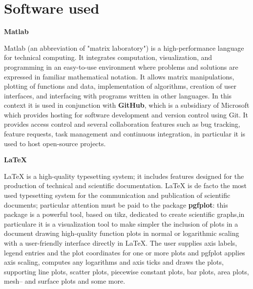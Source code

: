 \documentclass[[12pt,twoside]{book}
\begin{document}
\chapter%
   [Software used]%
   {Software used}
\label{chap:Appendix:Software:Used}
{\Large\textbf{Matlab}}
\bigskip
\noindent

 Matlab (an abbreviation of "matrix laboratory") is a high-performance language for technical computing. It integrates computation, visualization, and programming in an easy-to-use environment where problems and solutions are expressed in familiar mathematical notation.
 It allows matrix manipulations, plotting of functions and data, implementation of algorithms, creation of user interfaces, and interfacing with programs written in other languages. In this context it is used in conjunction with \textbf{GitHub}, which is a subsidiary of Microsoft which provides hosting for software development and version control using Git. It provides access control and several collaboration features such as bug tracking, feature requests, task management and continuous integration, in  particular it is used to host open-source projects.
\bigskip

\noindent
{\Large\textbf{\LaTeX{}}}
\bigskip

\LaTeX{} is a high-quality typesetting system; it includes features designed for the production of technical and scientific documentation. \LaTeX{} is de facto the most used typesetting system for the communication and publication of scientific documents; particular attention must be paid to the package  \textbf{pgfplot}: this package is a powerful tool, based on tikz, dedicated to create scientific graphs,in particulare it is a visualization tool to make simpler the inclusion of plots in a document drawing high-quality function plots in normal or logarithmic scaling with a user-friendly interface directly in \LaTeX{}. The user supplies axis labels, legend entries and the plot coordinates for one or more plots and pgfplot applies axis scaling, computes any logarithms and axis ticks and draws the plots, supporting line plots, scatter plots, piecewise constant plots, bar plots, area plots, mesh-- and surface plots and some more.
\end{document}
